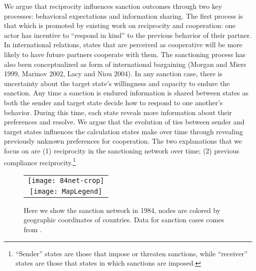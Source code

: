 We argue that reciprocity influences sanction outcomes through two key processes: behavioral expectations and information sharing. The first process is that which is promoted by existing work on reciprocity and cooperation: one actor has incentive to ``respond in kind'' to the previous behavior of their partner. In international relations, states that are perceived as cooperative will be more likely to have future partners cooperate with them.
The sanctioning process has also been conceptualized as form of international bargaining (Morgan and Miers 1999, Marinov 2002, Lacy and Niou 2004). In any sanction case, there is uncertainty about the target state's willingness and capacity to endure the sanction.  Any time a sanction is endured information is shared between states as both the sender and target state decide how to respond to one another's behavior. During this time, each state reveals more information about their preferences and resolve.  We argue that the evolution of ties between sender and target states influences the calculation states make over time through revealing previously unknown preferences for cooperation. The two explanations that we focus on are (1) reciprocity in the sanctioning network over time; (2) previous compliance reciprocity.\footnote{``Sender'' states are those that impose or threaten sanctions, while ``receiver'' states are those that states in which sanctions are imposed.}

\begin{figure}[ht]
  \centering
  \begin{tabular}{c}
	  \texttt{[image: 84net-crop]} \\
	  \texttt{[image: MapLegend]}
  \end{tabular}
  \caption{Here we show the sanction network in 1984, nodes are colored by geographic coordinates of countries. Data for sanction cases comes from \citet{morgan2009threat}.}
  \label{fig:spaghetti}
\end{figure}
\FloatBarrier

